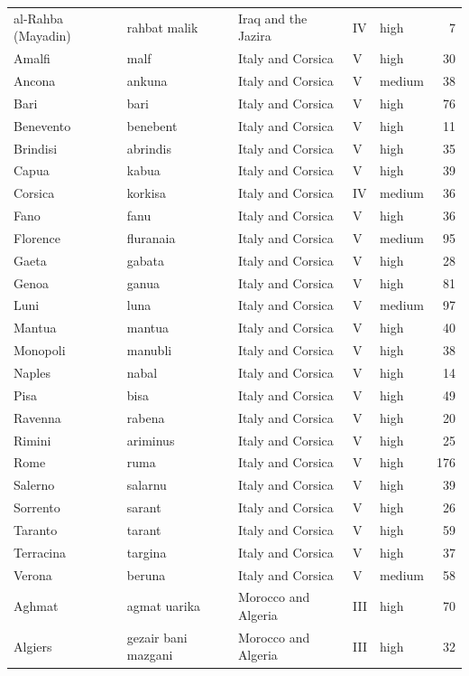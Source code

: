 \documentclass[11pt,a4paper]{article}
\begin{document}
{\begin{longtable}{p{4.6cm}p{3.0cm}p{3.6cm}llr}
al-Rahba (Mayadin) & rahbat malik & Iraq and the Jazira & IV & high & 7\\
Amalfi & malf & Italy and Corsica & V & high & 30\\
Ancona & ankuna & Italy and Corsica & V & medium & 38\\
Bari & bari & Italy and Corsica & V & high & 76\\
Benevento & benebent & Italy and Corsica & V & high & 11\\
Brindisi & abrindis & Italy and Corsica & V & high & 35\\
Capua & kabua & Italy and Corsica & V & high & 39\\
Corsica & korkisa & Italy and Corsica & IV & medium & 36\\
Fano & fanu & Italy and Corsica & V & high & 36\\
Florence & fluranaia & Italy and Corsica & V & medium & 95\\
Gaeta & gabata & Italy and Corsica & V & high & 28\\
Genoa & ganua & Italy and Corsica & V & high & 81\\
Luni & luna & Italy and Corsica & V & medium & 97\\
Mantua & mantua & Italy and Corsica & V & high & 40\\
Monopoli & manubli & Italy and Corsica & V & high & 38\\
Naples & nabal & Italy and Corsica & V & high & 14\\
Pisa & bisa & Italy and Corsica & V & high & 49\\
Ravenna & rabena & Italy and Corsica & V & high & 20\\
Rimini & ariminus & Italy and Corsica & V & high & 25\\
Rome & ruma & Italy and Corsica & V & high & 176\\
Salerno & salarnu & Italy and Corsica & V & high & 39\\
Sorrento & sarant & Italy and Corsica & V & high & 26\\
Taranto & tarant & Italy and Corsica & V & high & 59\\
Terracina & targina & Italy and Corsica & V & high & 37\\
Verona & beruna & Italy and Corsica & V & medium & 58\\
Aghmat & agmat uarika & Morocco and Algeria & III & high & 70\\
Algiers & gezair bani mazgani & Morocco and Algeria & III & high & 32\\

\end{longtable}}
\end{document}

